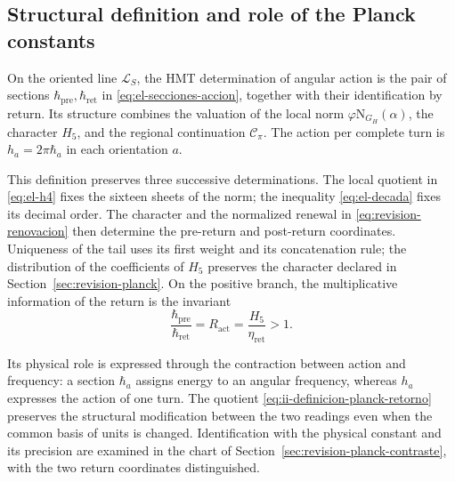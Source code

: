 \subsection{Structural definition and role of the Planck constants}
\label{sec:ii-definicion-planck}

\begin{definition}
On the oriented line \(\mathcal L_S\), the HMT determination of
angular action is the pair of sections
\(\hbar_{\mathrm{pre}},\hbar_{\mathrm{ret}}\) in
\eqref{eq:el-secciones-accion}, together with their identification by return.
Its structure combines the valuation of the local norm
\(\varphi\mathrm N_{G_H}(\alpha)\), the character \(H_5\), and the
regional continuation \(\mathcal C_\pi\). The action per complete turn
is \(h_a=2\pi\hbar_a\) in each orientation \(a\).
\end{definition}

This definition preserves three successive determinations. The local
quotient in \eqref{eq:el-h4} fixes the sixteen sheets of the norm;
the inequality \eqref{eq:el-decada} fixes its decimal order. The character and
the normalized renewal in \eqref{eq:revision-renovacion} then determine
the pre-return and post-return coordinates. Uniqueness of the tail
uses its first weight and its concatenation rule; the distribution of
the coefficients of \(H_5\) preserves the character declared in
Section~\ref{sec:revision-planck}. On the positive branch, the multiplicative
information of the return is the invariant
\begin{equation}
 \frac{\hbar_{\mathrm{pre}}}{\hbar_{\mathrm{ret}}}
 =R_{\mathrm{act}}=\frac{H_5}{\eta_{\mathrm{ret}}}>1.
 \label{eq:ii-definicion-planck-retorno}
\end{equation}

Its physical role is expressed through the contraction between action and
frequency: a section \(\hbar_a\) assigns energy to an angular
frequency, whereas \(h_a\) expresses the action of one turn. The quotient
\eqref{eq:ii-definicion-planck-retorno} preserves the structural
modification between the two readings even when the common basis
of units is changed. Identification with the physical constant and its precision
are examined in the chart of Section~\ref{sec:revision-planck-contraste},
with the two return coordinates distinguished.
